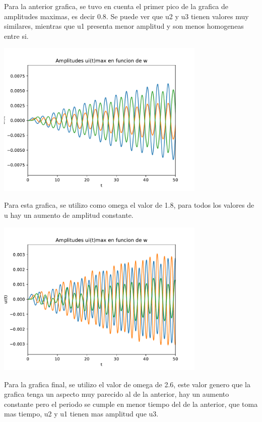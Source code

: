 \documentclass[11pt,letterpaper]{exam}
\begin{document}
Para la anterior grafica, se tuvo en cuenta el primer pico de la grafica de amplitudes maximas, es decir 0.8. Se puede ver que u2 y u3 tienen valores muy similares, mientras que u1 presenta menor amplitud y son menos homogeneas entre si. 

\begin{center}
\includegraphics[width=10cm]{TerceraGraficaUi(t).pdf}
\end{center}

Para esta grafica, se utilizo como omega el valor de 1.8, para todos los valores de u hay un aumento de amplitud constante. 

\begin{center}
\includegraphics[width=10cm]{CuartaGraficaUi(t).pdf}
\end{center}

Para la grafica final, se utilizo el valor de omega de 2.6, este valor genero que la grafica tenga un aspecto muy parecido al de la anterior, hay un aumento constante pero el periodo se cumple en menor tiempo del de la anterior, que toma mas tiempo, u2 y u1 tienen mas amplitud que u3. 
\end{document}
